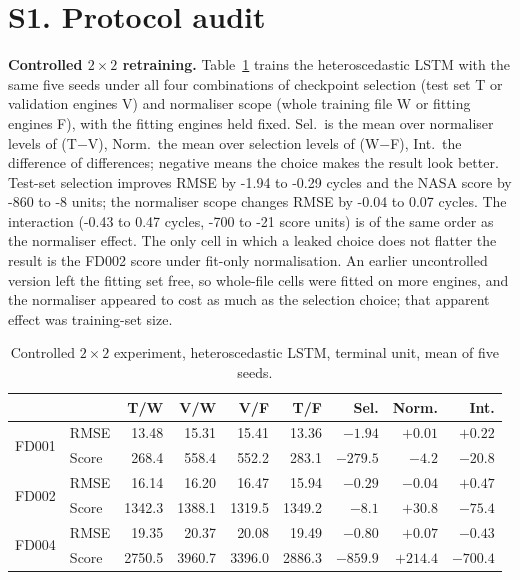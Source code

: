 \documentclass[10pt,a4paper]{article}
\newcommand{\NLeakExceptions}{FD002 score under fit-only normalisation}
\newcommand{\NSelEffRMSE}{-1.94 to -0.29}
\newcommand{\NNormEffRMSE}{-0.04 to 0.07}
\newcommand{\NIntEffRMSE}{-0.43 to 0.47}
\newcommand{\NSelEffScore}{-860 to -8}
\newcommand{\NIntEffScore}{-700 to -21}
\begin{document}
\section*{S1. Protocol audit}
\textbf{Controlled $2\times2$ retraining.} Table~\ref{tab:leak} trains the heteroscedastic LSTM with the same five seeds under all four combinations of checkpoint selection (test set T or validation engines V) and normaliser scope (whole training file W or fitting engines F), with the fitting engines held fixed. Sel.\ is the mean over normaliser levels of (T$-$V), Norm.\ the mean over selection levels of (W$-$F), Int.\ the difference of differences; negative means the choice makes the result look better. Test-set selection improves RMSE by \NSelEffRMSE{} cycles and the NASA score by \NSelEffScore{} units; the normaliser scope changes RMSE by \NNormEffRMSE{} cycles. The interaction (\NIntEffRMSE{} cycles, \NIntEffScore{} score units) is of the same order as the normaliser effect. The only cell in which a leaked choice does not flatter the result is the \NLeakExceptions. An earlier uncontrolled version left the fitting set free, so whole-file cells were fitted on more engines, and the normaliser appeared to cost as much as the selection choice; that apparent effect was training-set size.
\begin{table}[H]\centering\footnotesize
\caption{Controlled $2\times2$ experiment, heteroscedastic LSTM, terminal unit, mean of five seeds.}\label{tab:leak}
\begin{tabular}{llrrrr|rrr}\toprule
 & & T/W & V/W & V/F & T/F & Sel. & Norm. & Int. \\ \midrule
\multirow{2}{*}{FD001} & RMSE & 13.48 & 15.31 & 15.41 & 13.36 & $-1.94$ & $+0.01$ & $+0.22$ \\
 & Score & 268.4 & 558.4 & 552.2 & 283.1 & $-279.5$ & $-4.2$ & $-20.8$ \\
\midrule
\multirow{2}{*}{FD002} & RMSE & 16.14 & 16.20 & 16.47 & 15.94 & $-0.29$ & $-0.04$ & $+0.47$ \\
 & Score & 1342.3 & 1388.1 & 1319.5 & 1349.2 & $-8.1$ & $+30.8$ & $-75.4$ \\
\midrule
\multirow{2}{*}{FD004} & RMSE & 19.35 & 20.37 & 20.08 & 19.49 & $-0.80$ & $+0.07$ & $-0.43$ \\
 & Score & 2750.5 & 3960.7 & 3396.0 & 2886.3 & $-859.9$ & $+214.4$ & $-700.4$ \\
\bottomrule\end{tabular}
\end{table}
\end{document}
